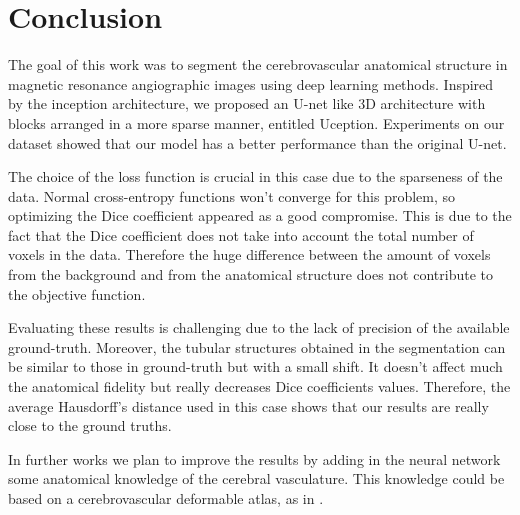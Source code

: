 \documentclass{article}
\begin{document}
\section{Conclusion}

The goal of this work was to segment the cerebrovascular anatomical structure in magnetic resonance angiographic images using deep learning methods. Inspired by the inception architecture, we proposed an U-net like 3D architecture with blocks arranged in a more sparse manner, entitled Uception. Experiments on our dataset showed that our model has a better performance than the original U-net.

The choice of the loss function is crucial in this case due to the sparseness of the data. Normal cross-entropy functions won't converge for this problem, so optimizing the Dice coefficient appeared as a good compromise. This is due to the fact that the Dice coefficient does not take into account the total number of voxels in the data. Therefore the huge difference between the amount of voxels from the background and from the anatomical structure does not contribute to the objective function.

Evaluating these results is challenging due to the lack of precision of the available ground-truth. Moreover, the tubular structures obtained in the segmentation can be similar to those in ground-truth but with a small shift. It doesn't affect much the anatomical fidelity but really decreases Dice coefficients values. Therefore, the average Hausdorff's distance used in this case shows that our results are really close to the ground truths. 

In further works we plan to improve the results by adding in the neural network some anatomical knowledge of the cerebral vasculature. This knowledge could be based on a cerebrovascular deformable atlas, as in \cite{Dufour:2013}.






\end{document}
